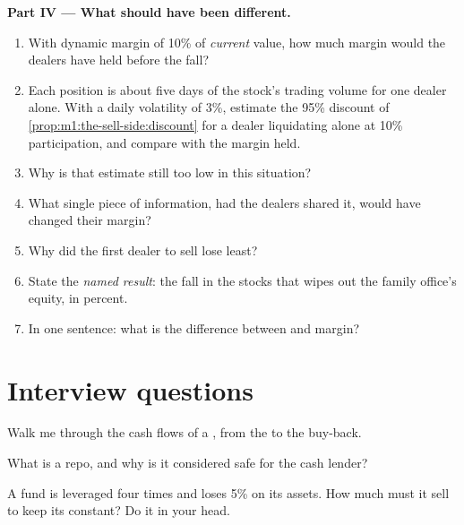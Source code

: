 \begin{problem}
\medskip\noindent\textbf{Part IV --- What should have been different.}
\begin{enumerate}[resume]
\item With dynamic margin of 10\% of \emph{current} value, how much margin
would the dealers have held before the fall?
\item Each position is about five days of the stock's trading volume for one
dealer alone. With a daily volatility of 3\%, estimate the 95\% discount of
\cref{prop:m1:the-sell-side:discount} for a dealer liquidating alone at 10\%
participation, and compare with the margin held.
\item Why is that estimate still too low in this situation?
\item What single piece of information, had the dealers shared it, would
have changed their margin?
\item Why did the first dealer to sell lose least?
\item State the \emph{named result}: the fall in the stocks that wipes out
the family office's equity, in percent.
\item In one sentence: what is the difference between  and margin?
\end{enumerate}
\end{problem}

\section{Interview questions}

\begin{interviewq}\label{iq:m1:financing:1}
Walk me through the cash flows of a , from the  to the
buy-back.
\end{interviewq}

\begin{interviewq}\label{iq:m1:financing:2}
What is a repo, and why is it considered safe for the cash lender?
\end{interviewq}

\begin{interviewq}\label{iq:m1:financing:3}
A fund is leveraged four times and loses 5\% on its assets. How much must it
sell to keep its  constant? Do it in your head.
\end{interviewq}

